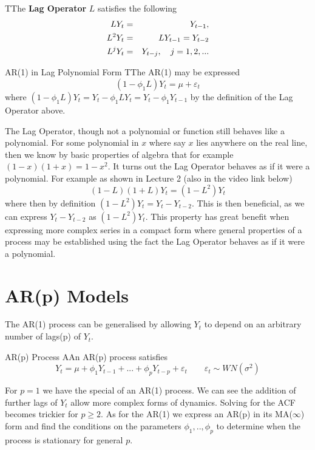 \documentclass[openany]{tufte-book} %
\begin{document}
         TThe \textbf{Lag Operator} $L$ satisfies the following
\begin{eqnarray*}
LY_{t} &=&Y_{t-1}, \\
L^{2}Y_{t} &=&LY_{t-1}=Y_{t-2} \\
L^{j}Y_{t} &=&Y_{t-j},\text{\quad }j=1,2,...
\end{eqnarray*}%


\begin{myex}{ AR(1) in Lag Polynomial Form} TThe AR(1) may be expressed
\begin{equation*}
\left( 1-\phi _{1}L\right)Y_t=\mu+\varepsilon_t
\end{equation*}
where $(1-\phi_1L)Y_t=Y_t-\phi_1LY_t=Y_t-\phi_1Y_{t-1}$ by the definition of the Lag Operator above. \end{myex}
 The Lag Operator, though not a polynomial or function still behaves like a polynomial. For some polynomial in $x$ where say $x$ lies anywhere on the real line, then we know by basic properties of algebra that  for example $(1-x)(1+x)=1-x^2$. It turns out the Lag Operator behaves as if it were a polynomial. For example as shown in Lecture 2 (also in the video link below)
\begin{equation*} (1-L)(1+L)Y_t=(1-L^2)Y_t \end{equation*}
where then by definition $(1-L^2)Y_t=Y_t-Y_{t-2}$. This is then beneficial, as we can express $Y_t - Y_{t-2}$ as $(1-L^2)Y_{t}$. This property has great benefit when expressing more complex series in a compact form where general properties of a process may be established using the fact the Lag Operator behaves as if it were a polynomial. 
\section{AR(p) Models}
The AR(1) process can be generalised by allowing $Y_t$ to depend on an arbitrary number of lags(p) of $Y_t$.
\begin{mydef}{AR(p) Process}
AAn AR(p) process satisfies
\begin{equation*}
Y_{t}=\mu +\phi _{1}Y_{t-1}+...+\phi _{p}Y_{t-p}+\varepsilon _{t} \qquad \varepsilon_{t}\sim WN(\sigma^2)
\end{equation*} \end{mydef}
For $p=1$ we have the special of an AR(1) process. We can see the addition of further lags of $Y_t$ allow more complex forms of dynamics. Solving for the ACF becomes trickier for $p \geq 2$. As for the AR(1) we express an AR(p) in its MA($\infty$) form and find the conditions on the parameters $ \phi_1,..,\phi_p$ to determine when the process is stationary for general $p$.
\end{document}
